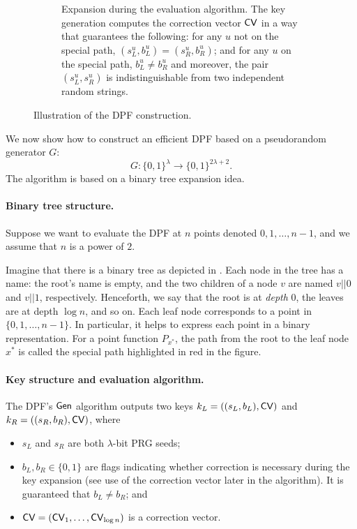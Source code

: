 \begin{figure}[t]
\begin{subfigure}{0.48\textwidth}
        \caption{Expansion during the evaluation algorithm.
The key generation computes the correction vector ${\sf CV}$ 
in a way that guarantees the following: 
for any $u$ not on the special
path, $(s_L^u, b_L^u) = (s_R^u, b_R^u)$;
and for any $u$ on the special path, 
$b_L^u \neq b_R^u$ and moreover,
the pair $(s_L^u, s_R^u)$ is indistinguishable
from two independent random strings.
}
\label{fig:expand}
    \end{subfigure}
     \caption{Illustration of the DPF construction.\label{fig:dpf-demo}}
\end{figure}





We now show how to construct an efficient DPF based on a pseudorandom
generator $G$:
 $$G: \{0,1\}^{\lambda} \rightarrow  \{0,1\}^{2\lambda + 2}. $$
The algorithm is based on a binary tree expansion idea.

\paragraph{Binary tree structure.}
Suppose we want to evaluate the DPF
at $n$ points denoted $0, 1, \ldots,  n-1$,
and we assume that $n$ is a power of $2$.

Imagine that there is a binary tree
as depicted in .
Each node in the tree has a name:  
the root's name is empty, and the two children of a node $v$ 
are named $v||0$ and $v||1$, respectively.
Henceforth, we say that the root is at {\it depth} $0$, the leaves
are at depth $\log n$, and so on.
Each leaf node corresponds to a point in 
$\{0, 1, \ldots, n-1\}$. In particular, it helps to express
each point in a binary representation.
For a point function $P_{x^*}$, 
the path from the root to the leaf node $x^*$ 
is called the special path highlighted in {\color{red}red}
in the figure. 

\paragraph{Key structure and evaluation algorithm.}
The DPF's ${\sf Gen}$ algorithm outputs two keys
$k_L = ((s_L, b_L), {{\sf CV}})$ and $k_R = ((s_R, b_R), {{\sf CV}})$,
where 
\begin{itemize}[leftmargin=7mm]
\item $s_L$ and $s_R$ are both $\lambda$-bit PRG seeds;
\item 
$b_L, b_R\in \{0, 1\}$ are flags indicating whether 
correction is necessary during the key expansion (see use
of the correction vector later in the algorithm). It
is guaranteed that $b_L \neq b_R$; 
and 
\item 
${\sf CV} = ({\sf CV}_1, \ldots, {\sf CV}_{\log n})$ 
is a correction vector.
\end{itemize}

